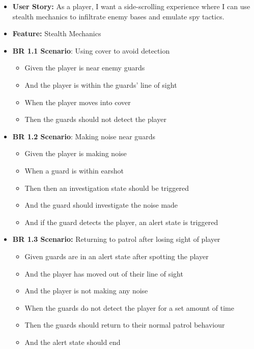 \documentclass[11pt, a4paper]{article}
\begin{document}
\begin{itemize}
    \item \textbf{User Story:} As a player, I want a side-scrolling experience
          where I can use stealth mechanics to infiltrate enemy bases and emulate
          spy tactics.

    \item \textbf{Feature:} Stealth Mechanics

    \item \textbf{BR 1.1 Scenario}: Using cover to avoid detection

          \begin{itemize}
              \item Given the player is near enemy guards
              \item And the player is within the guards' line of sight
              \item When the player moves into cover
              \item Then the guards should not detect the player
          \end{itemize}

    \item \textbf{BR 1.2 Scenario}: Making noise near guards

          \begin{itemize}
              \item Given the player is making noise
              \item When a guard is within earshot
              \item Then then an investigation state should be triggered
              \item And the guard should investigate the noise made
              \item And if the guard detects the player, an alert state is triggered
          \end{itemize}

    \item \textbf{BR 1.3 Scenario:} Returning to patrol after losing sight of player

          \begin{itemize}
              \item Given guards are in an alert state after spotting the player
              \item And the player has moved out of their line of sight
              \item And the player is not making any noise
              \item When the guards do not detect the player for a set amount of time
              \item Then the guards should return to their normal patrol behaviour
              \item And the alert state should end
          \end{itemize}


\end{itemize}
\end{document}
